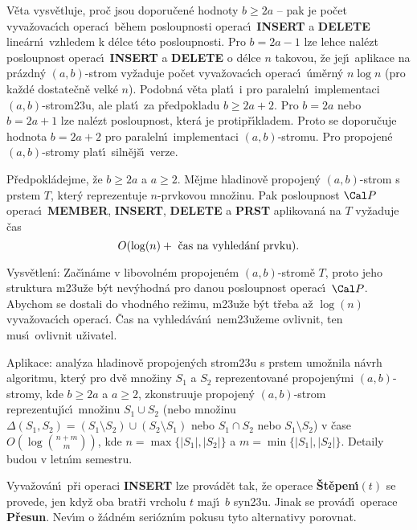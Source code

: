\flushpar V\v eta vysv\v etluje, pro\v c jsou doporu\v cen\'e hodnoty $
b\ge 2a$ -- 
pak je po\v cet vyva\v zovac\'\i ch ope\-rac\'\i\ b\v ehem posloupnosti 
operac\'\i\ {\bf INSERT} a {\bf DELETE} line\'arn\'\i\ vzhledem k d\'elce 
t\'eto posloupnosti. Pro $b=2a-1$ lze lehce nal\'ezt 
posloupnost operac\'\i\ {\bf INSERT} a {\bf DELETE} o d\'elce $n$ takovou, 
\v ze jej\'\i\ aplikace na pr\'azdn\'y $(a,b)$-strom vy\v zaduje po\v cet 
vyva\v zovac\'\i ch operac\'\i\ \'u\-m\v ern\'y $n\log n$ (pro ka\v zd\'e 
dostate\v cn\v e velk\'e $n$). Podobn\'a v\v eta plat\'\i\ i pro paraleln\'\i\ 
implementaci $(a,b)$-strom\accent23u, ale plat\'\i\ za 
p\v redpokladu $b\ge 2a+2$. Pro $b=2a$ nebo $b=2a+1$ lze 
nal\'ezt posloupnost, kter\'a je protip\v r\'\i kladem. Proto se 
doporu\v cuje hodnota $b=2a+2$ pro paraleln\'\i\ implementaci 
$(a,b)$-stromu. Pro propojen\'e $(a,b)$-stromy plat\'\i\ siln\v ej\v s\'\i\ 
verze.

P\v redpokl\'adejme, \v ze $b\ge 2a$ a $a\ge 2$. M\v ejme 
hladinov\v e propojen\'y $(a,b)$-strom s prstem $T$, kter\'y reprezentuje 
$n$-prvkovou mno\v zinu. Pak posloupnost $\Cal P$ operac\'\i\ {\bf MEMBER},
{\bf INSERT}, {\bf DELETE} a {\bf PRST} aplikovan\'a na $T$ vy\v zaduje \v cas 
$$O(\log(n)+\text{\rm\ \v cas na vyhled\'an\'\i\ prvk\accent23u})
.$$
\endproclaim


\flushpar Vysv\v etlen\'\i : Za\v c\'\i n\'ame v libovoln\'em 
propojen\'em $(a,b)$-stro\-m\v e $T$, proto jeho struktura 
m\accent23u\v ze b\'yt nev\'yhodn\'a pro danou pos\-loupnost operac\'\i\ $
\Cal P$. 
Abychom se dostali do vhodn\'eho re\v zimu, m\accent23u\v ze 
b\'yt t\v reba a\v z $\log(n)$ vyva\v zovac\'\i ch operac\'\i . \v Cas na 
vy\-hled\'av\'a\-n\'\i\ nem\accent23u\v zeme ovlivnit, ten mus\'\i\ 
ovlivnit u\v zivatel.
\medskip

\flushpar Aplikace: anal\'yza hladinov\v e propojen\'ych strom\accent23u s prstem 
u\-mo\v z\-nila n\'avrh algoritmu, kter\'y pro dv\v e mno\v ziny $
S_1$ a $S_2$ 
repre\-zentovan\'e propojen\'ymi $(a,b)$-stromy, kde $b\ge 2a$ a 
$a\ge 2$, 
zkonstruuje propojen\'y $(a,b)$-strom reprezentuj\'\i c\'\i\ mno\v zinu 
$S_1\cup S_2$ (nebo mno\v zinu $\Delta (S_1,S_2)=(S_1\setminus S_
2)\cup (S_2\setminus S_1)$ nebo 
$S_1\cap S_2$ nebo $S_1\setminus S_2$) v \v case $O(\log\binom {n
+m}m)$, kde 
$n=\max\{|S_1|,|S_2|\}$ a $m=\min\{|S_1|,|S_2|\}$. Detaily budou v letn\'\i m 
semestru.
\medskip

\flushpar Vyva\v zov\'an\'\i\ p\v ri operaci {\bf INSERT} lze prov\'ad\v et 
tak, \v ze operace {\bf \v St\v epen\'\i$(t)$} se provede, jen kdy\v z oba 
brat\v ri vrcholu $t$ maj\'\i\ $b$ syn\accent23u. Jinak se prov\'ad\'\i\ 
operace {\bf P\v resun}. Nev\'\i m o \v z\'adn\'em seri\'ozn\'\i m pokusu tyto 
alternativy porovnat.   
\medskip

